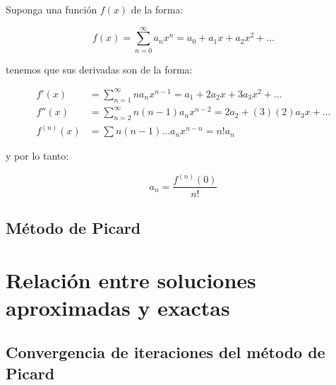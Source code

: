 		\begin{ejemplo}
		\end{ejemplo}

		\begin{observacion}
			Suponga una función $f(x)$ de la forma:

			\begin{equation}
				f(x) = \sum_{n=0}^{\infty} a_n x^n = a_0 + a_1 x + a_2 x^2 + \dots
			\end{equation}

			tenemos que sus derivadas son de la forma:

			\begin{align*}
				f'(x) &= \sum_{n=1}^{\infty} n a_n x^{n-1} = a_1 + 2 a_2 x + 3 a_3 x^2 + \dots \\
				f''(x) &= \sum_{n=2}^{\infty} n (n-1) a_n x^{n-2} = 2 a_2 + (3)(2) a_3 x + \dots \\
				f^{(n)}(x) &= \sum n (n-1) \dots a_n x^{n-n} = n! a_n
			\end{align*}

			y por lo tanto:

			\begin{equation*}
				a_n = \frac{f^{(n)}(0)}{n!}
			\end{equation*}
		\end{observacion}

	\newpage
	\subsection{Método de Picard}

\newpage
\section{Relación entre soluciones aproximadas y exactas}

	\subsection{Convergencia de iteraciones del método de Picard}
